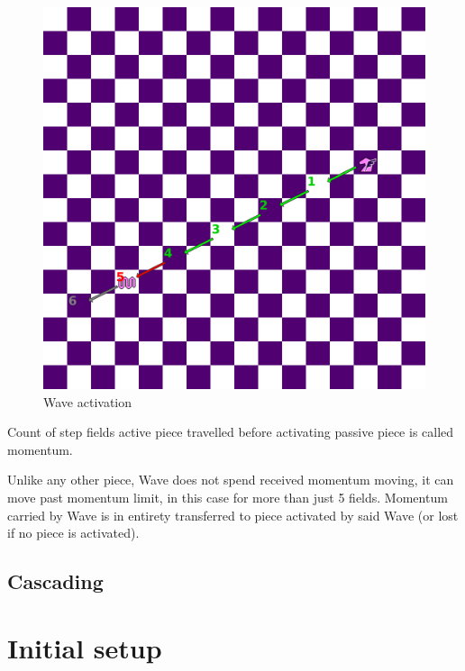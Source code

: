 \documentclass[a5paper,12pt,draft]{book} %
\begin{document}
\noindent
\begin{figure}[h]
\includegraphics[width=1.0\textwidth, keepaspectratio=true]{../gfx/examples/12_move_wave_init.png}
\caption{Wave activation}
\label{fig:wave_activation}
\end{figure}

Count of step fields active piece travelled before activating
passive piece is called momentum.


\clearpage

Unlike any
other piece, Wave does not spend received momentum moving, it can
move past momentum limit, in this case for more than just 5 fields.
Momentum carried by Wave is in entirety transferred to piece
activated by said Wave (or lost if no piece is activated).

\clearpage

\subsection*{Cascading}

\clearpage

\section*{Initial setup}
\end{document}
